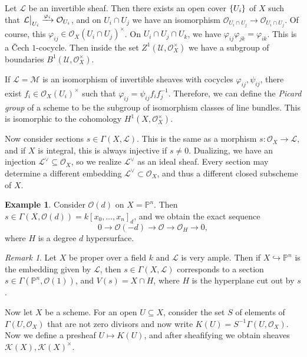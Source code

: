 \documentclass[leqno, openany]{memoir}
\theoremstyle{definition}
\newtheorem{exm}[thm]{Example}
\theoremstyle{remark}
\newtheorem{rmk}[thm]{Remark}
\theoremstyle{plain}
\theoremstyle{definition}
\theoremstyle{remark}
\renewcommand{\P}{\mathbb{P}}
\newcommand{\mc}[1]{\mathcal{#1}}
\begin{document}
Let $\mc{L}$ be an invertible sheaf. Then there exists an open cover
$\qty{U_i}$ of $X$ such that $\eval{\mc{L}}_{U_i} \xrightarrow{\varphi_i}
\mc{O}_{U_i}$, and on $U_i \cap U_j$ we have an isomorphism $\mc{O}_{U_i \cap
U_j} \to \mc{O}_{U_i \cap U_j}$. Of course, this $\varphi_{ij} \in
{\mc{O}_X(U_i \cap U_j)}^{\times}$. On $U_i \cap U_j \cap U_k$, we have
$\varphi_{ij} \varphi_{jk} = \varphi_{ik}$. This is a {\v{C}}ech $1$-cocycle.
Then inside the set $Z^1(\mc{U}, \mc{O}_X^{\times})$ we have a subgroup of
boundaries $B^1(\mc{U}, \mc{O}_X^{\times})$. 

If $\mc{L} = \mc{M}$ is an isomorphism of invertible sheaves with cocycles
$\varphi_{ij}, \psi_{ij}$, there exist $f_i \in {\mc{O}_X(U_i)}^{\times}$ such
that $\varphi_{ij} = \psi_{ij} f_i f_j^{-1}$. Therefore, we can define the
\textit{Picard group} of a scheme to be the subgroup of isomorphism classes of
line bundles. This is isomorphic to the cohomology $H^1(X, \mc{O}_X^{\times})$.

Now consider sections $s \in \Gamma(X, \mc{L})$. This is the same as a morphism
$s \colon \mc{O}_X \to \mc{L}$, and if $X$ is integral, this is always
injective if $s \neq 0$. Dualizing, we have an injection $\mc{L}^{\vee}
\subseteq \mc{O}_X$, so we realize $\mc{L}^{\vee}$ as an ideal sheaf. Every
section may determine a different embedding $\mc{L}^{\vee} \subset \mc{O}_X$,
and thus a different closed subscheme of $X$.

\begin{exm} Consider $\mc{O}(d)$ on $X = \P^n$. Then $s \in \Gamma(X,
    \mc{O}(d)) = {k[x_0, \ldots, x_n]}_d$, and we obtain the exact sequence \[
    0 \to \mc{O}(-d) \to \mc{O} \to \mc{O}_H \to 0, \] where $H$ is a degree
$d$ hypersurface.  \end{exm}

\begin{rmk} Let $X$ be proper over a field $k$ and $\mc{L}$ is very ample. Then
    if $X \hookrightarrow \P^n$ is the embedding given by $\mc{L}$, then $s \in
    \Gamma(X, \mc{L})$ corresponds to a section $s \in \Gamma(\P^n,
    \mc{O}(1))$, and $V(s) = X \cap H$, where $H$ is the hyperplane cut out by
    $s$.  \end{rmk}

Now let $X$ be a scheme. For an open $U \subseteq X$, consider the set $S$ of
elements of $\Gamma(U, \mc{O}_X)$ that are not zero divisors and now write
$K(U) = S^{-1} \Gamma(U, \mc{O}_X)$. Now we define a presheaf $U \mapsto K(U)$,
and after sheafifying we obtain sheaves $\mc{K}(X), {\mc{K}(X)}^{\times}$.
\end{document}
